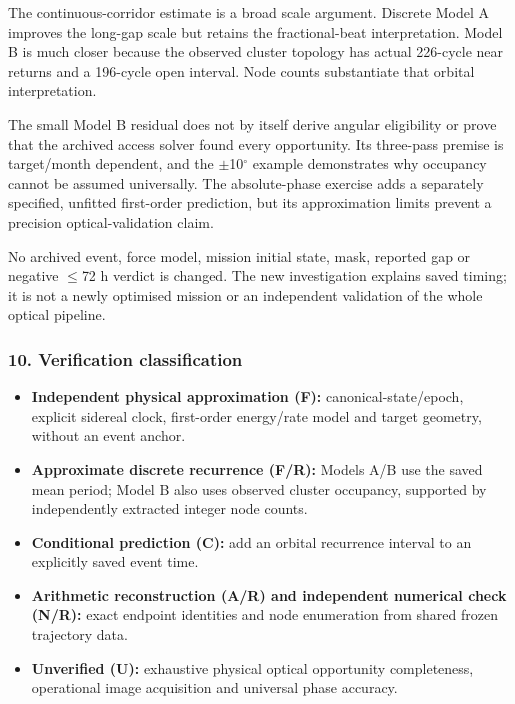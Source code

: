 \documentclass[10pt,a4paper]{article}
\numberwithin{equation}{section}
\begin{document}
\begin{sloppypar}The continuous-corridor estimate is a broad scale argument. Discrete Model A improves the long-gap scale but retains the fractional-beat interpretation. Model B is much closer because the observed cluster topology has actual 226-cycle near returns and a 196-cycle open interval. Node counts substantiate that orbital interpretation.\end{sloppypar}


\begin{sloppypar}The small Model B residual does not by itself derive angular eligibility or prove that the archived access solver found every opportunity. Its three-pass premise is target/month dependent, and the \ensuremath{\pm}10\ensuremath{{}^{\circ}} example demonstrates why occupancy cannot be assumed universally. The absolute-phase exercise adds a separately specified, unfitted first-order prediction, but its approximation limits prevent a precision optical-validation claim.\end{sloppypar}


\begin{sloppypar}No archived event, force model, mission initial state, mask, reported gap or negative \ensuremath{\le}72 h verdict is changed. The new investigation explains saved timing; it is not a newly optimised mission or an independent validation of the whole optical pipeline.\end{sloppypar}


\subsubsection*{10. Verification classification}

\begin{itemize}
\item \textbf{Independent physical approximation (F):} canonical-state/epoch, explicit sidereal clock, first-order energy/rate model and target geometry, without an event anchor.
\item \textbf{Approximate discrete recurrence (F/R):} Models A/B use the saved mean period; Model B also uses observed cluster occupancy, supported by independently extracted integer node counts.
\item \textbf{Conditional prediction (C):} add an orbital recurrence interval to an explicitly saved event time.
\item \textbf{Arithmetic reconstruction (A/R) and independent numerical check (N/R):} exact endpoint identities and node enumeration from shared frozen trajectory data.
\item \textbf{Unverified (U):} exhaustive physical optical opportunity completeness, operational image acquisition and universal phase accuracy.
\end{itemize}
\end{document}

